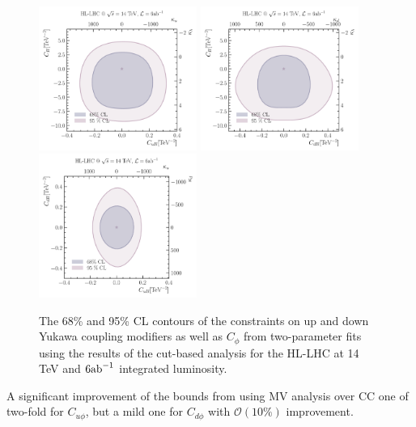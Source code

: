 \begin{figure}[htpb!]
	\centering
	\includegraphics[width=0.46\textwidth]{fig/kukl-HL-LHC} %
	\includegraphics[width=0.46\textwidth]{fig/kdkl-HL-LHC} 
	\includegraphics[width=0.46\textwidth]{fig/kdku-HL-LHC}  \\
	\caption{The  68\% and 95\% CL contours of the constraints on up and down Yukawa coupling modifiers as well as $C_\phi$ from two-parameter fits using the results of the cut-based analysis for the HL-LHC at 14 TeV and $6 \invab$ integrated luminosity. }
	\label{fig:rescut}
\end{figure}  
A significant improvement of the bounds from using MV analysis over CC one of two-fold for $C_{u \phi}$,  but a mild one for $C_{d\phi}$ with $\mathcal O(10\%)$ improvement.\\ 

